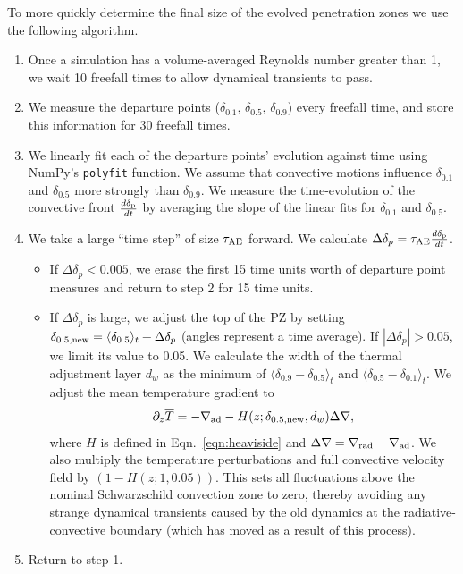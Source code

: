 \documentclass[twocolumn]{aastex631}
\newcommand{\gradrad}{\ensuremath{\nabla_{\rm{rad}}}}
\newcommand{\gradad}{\ensuremath{\nabla_{\rm{ad}}}}
\newcommand{\justgrad}{\ensuremath{\nabla}}
\newcommand{\delp}{\ensuremath{\delta_{\rm{p}}}}
\newcommand{\angles}[1]{\langle #1 \rangle}
\begin{document}
To more quickly determine the final size of the evolved penetration zones we use the following algorithm.
\begin{enumerate}
\item Once a simulation has a volume-averaged Reynolds number greater than 1, we wait 10 freefall times to allow dynamical transients to pass.
\item We measure the departure points ($\delta_{0.1}$, $\delta_{0.5}$, $\delta_{0.9}$) every freefall time, and store this information for 30 freefall times.
\item We linearly fit each of the departure points' evolution against time using NumPy's \texttt{polyfit} function.
We assume that convective motions influence $\delta_{0.1}$ and $\delta_{0.5}$ more strongly than $\delta_{0.9}$.
We measure the time-evolution of the convective front $\frac{d \delp}{dt}$ by averaging the slope of the linear fits for $\delta_{0.1}$ and $\delta_{0.5}$.
\item We take a large ``time step'' of size $\tau_{\rm{AE}}$ forward.
We calculate $\Delta \delta_p = \tau_{\rm{AE}} \frac{d \delp}{dt}$.
\begin{itemize}
\item If $\Delta \delta_p < 0.005$, we erase the first 15 time units worth of departure point measures and return to step 2 for 15 time units.
\item  If $\Delta \delta_p$ is large, we adjust the top of the PZ by setting $\delta_{0.5,\rm{new}} = \angles{\delta_{0.5}}_t + \Delta \delta_p$ (angles represent a time average).
If $|\Delta \delta_p| > 0.05$, we limit its value to 0.05.
We calculate the width of the thermal adjustment layer $d_w$ as the minimum of $\angles{\delta_{0.9} - \delta_{0.5}}_t$ and $\angles{\delta_{0.5} - \delta_{0.1}}_t$.
We adjust the mean temperature gradient to
\begin{equation}
\partial_z \overline{T} = -\gradad - H(z; \delta_{\rm{0.5,\rm{new}}}, d_w) \Delta\justgrad,
\label{eqn:initial_grad}
\end{equation}
where $H$ is defined in Eqn.~\ref{eqn:heaviside} and $\Delta\justgrad = \gradrad - \gradad$.
We also multiply the temperature perturbations and full convective velocity field by $(1 - H(z; 1, 0.05))$.
This sets all fluctuations above the nominal Schwarzschild convection zone to zero, thereby avoiding any strange dynamical transients caused by the old dynamics at the radiative-convective boundary (which has moved as a result of this process).
\end{itemize}
\item Return to step 1.
\end{enumerate}
\end{document}
